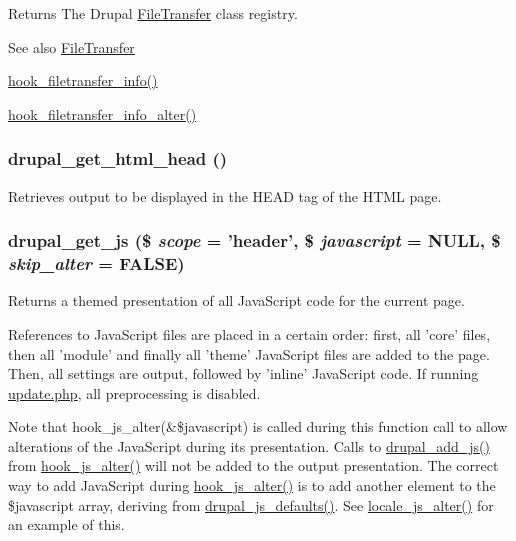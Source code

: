 \begin{DoxyReturn}{Returns}
The Drupal \hyperlink{classFileTransfer}{FileTransfer} class registry.
\end{DoxyReturn}
\begin{DoxySeeAlso}{See also}
\hyperlink{classFileTransfer}{FileTransfer} 

\hyperlink{group__hooks_gacecdedb61704444382417e6ec8da240d}{hook\_\-filetransfer\_\-info()} 

\hyperlink{group__hooks_ga96aeda9756a48de73dacbf8bf1745266}{hook\_\-filetransfer\_\-info\_\-alter()} 
\end{DoxySeeAlso}
\hypertarget{common_8inc_acdee011d76859a5a9280209df1175188}{
\subsubsection[{drupal\_\-get\_\-html\_\-head}]{\setlength{\rightskip}{0pt plus 5cm}drupal\_\-get\_\-html\_\-head ()}}
\label{common_8inc_acdee011d76859a5a9280209df1175188}
Retrieves output to be displayed in the HEAD tag of the HTML page. \hypertarget{common_8inc_ac4d279ffd40eae67ace8459cd3e6e3b5}{
\subsubsection[{drupal\_\-get\_\-js}]{\setlength{\rightskip}{0pt plus 5cm}drupal\_\-get\_\-js (\$ {\em scope} = {\ttfamily 'header'}, \/  \$ {\em javascript} = {\ttfamily NULL}, \/  \$ {\em skip\_\-alter} = {\ttfamily FALSE})}}
\label{common_8inc_ac4d279ffd40eae67ace8459cd3e6e3b5}
Returns a themed presentation of all JavaScript code for the current page.

References to JavaScript files are placed in a certain order: first, all 'core' files, then all 'module' and finally all 'theme' JavaScript files are added to the page. Then, all settings are output, followed by 'inline' JavaScript code. If running \hyperlink{update_8php}{update.php}, all preprocessing is disabled.

Note that hook\_\-js\_\-alter(\&\$javascript) is called during this function call to allow alterations of the JavaScript during its presentation. Calls to \hyperlink{common_8inc_a623370a2c3c2de0390dab078d17dca02}{drupal\_\-add\_\-js()} from \hyperlink{group__hooks_ga4e6dc7148292e5d6ce1754927a5ff06d}{hook\_\-js\_\-alter()} will not be added to the output presentation. The correct way to add JavaScript during \hyperlink{group__hooks_ga4e6dc7148292e5d6ce1754927a5ff06d}{hook\_\-js\_\-alter()} is to add another element to the \$javascript array, deriving from \hyperlink{common_8inc_a55203a07884e02b18a3be2a630c3fab3}{drupal\_\-js\_\-defaults()}. See \hyperlink{locale_8module_a8bb6cc68121ba7213df8d6a33b372853}{locale\_\-js\_\-alter()} for an example of this.


